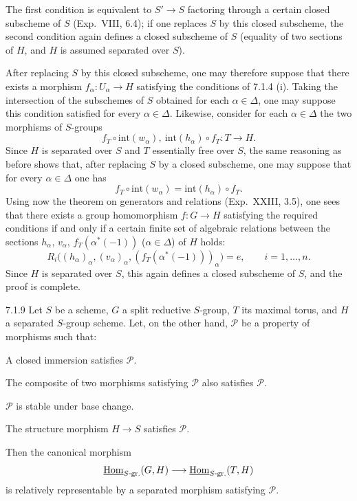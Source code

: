 The first condition is equivalent to $S'\to S$ factoring through a certain closed subscheme of $S$ (Exp.~VIII, 6.4); if one replaces $S$ by this closed subscheme, the second condition again defines a closed subscheme of $S$ (equality of two sections of $H$, and $H$ is assumed separated over $S$).

After replacing $S$ by this closed subscheme, one may therefore suppose that there exists a morphism $f_\alpha:U_\alpha\to H$ satisfying the conditions of 7.1.4 (i). Taking the intersection of the subschemes of $S$ obtained for each $\alpha\in\Delta$, one may suppose this condition satisfied for every $\alpha\in\Delta$.
\label{XXIV.7.1.7}
Likewise, consider for each $\alpha\in\Delta$ the two morphisms of $S$-groups
\[
f_T\circ\mathrm{int}(w_\alpha),\ \mathrm{int}(h_\alpha)\circ f_T:T\to H.
\]
Since $H$ is separated over $S$ and $T$ essentially free over $S$, the same reasoning as before shows that, after replacing $S$ by a closed subscheme, one may suppose that for every $\alpha\in\Delta$ one has
\[
f_T\circ\mathrm{int}(w_\alpha)=\mathrm{int}(h_\alpha)\circ f_T.
\]
\label{XXIV.7.1.8}
Using now the theorem on generators and relations (Exp.~XXIII, 3.5), one sees that there exists a group homomorphism $f:G\to H$ satisfying the required conditions if and only if a certain finite set of algebraic relations between the sections $h_\alpha$, $v_\alpha$, $f_T(\alpha^*(-1))$ ($\alpha\in\Delta$) of $H$ holds:
\[
R_i\bigl((h_\alpha)_\alpha,(v_\alpha)_\alpha,(f_T(\alpha^*(-1)))_\alpha\bigr)=e,\qquad i=1,\ldots,n.
\]
Since $H$ is separated over $S$, this again defines a closed subscheme of $S$, and the proof is complete.
\begin{corollary}{7.1.9}\label{XXIV.7.1.9}
Let $S$ be a scheme, $G$ a split reductive $S$-group, $T$ its maximal torus, and $H$ a separated $S$-group scheme. Let, on the other hand, $\mathscr P$ be a property of morphisms such that:
\begin{enumeratei}
\item A closed immersion satisfies $\mathscr P$.
\item The composite of two morphisms satisfying $\mathscr P$ also satisfies $\mathscr P$.
\item $\mathscr P$ is stable under base change.
\item The structure morphism $H\to S$ satisfies $\mathscr P$.
\end{enumeratei}
Then the canonical morphism
\[
\underline{\operatorname{Hom}}_{S\text{-gr.}}(G,H)\longrightarrow\underline{\operatorname{Hom}}_{S\text{-gr.}}(T,H)
\]
is relatively representable by a separated morphism satisfying $\mathscr P$.
\end{corollary}
